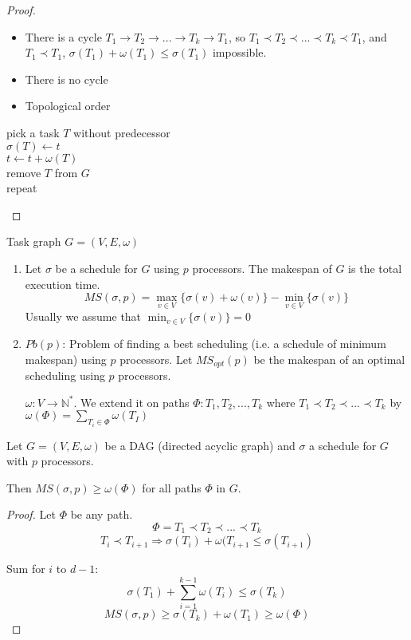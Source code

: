 \begin{proof}
\begin{itemize}
\item There is a cycle $T_1 \to T_2 \to ... \to T_k \to T_1$, so  $T_1 \prec T_2 \prec ... \prec T_k \prec T_1$, and $T_1\prec T_1$, $\sigma(T_1) + \omega(T_1) \leq \sigma(T_1)$ impossible.
\item There is no cycle
\item Topological order
\end{itemize}
\begin{algorithm}
pick a task $T$ without predecessor\\
$\sigma(T) \leftarrow t$\\
$t\leftarrow t + \omega(T)$\\
remove $T$ from $G$\\
repeat\\
\end{algorithm}
\end{proof}

\begin{defi}[Makespan]
Task graph $G=(V,E,\omega )$
\begin{enumerate}
\item Let $\sigma$ be a schedule for $G$ using $p$ processors. The makespan of $G$ is the total execution time.
\[MS(\sigma, p) = \max_{v\in V} \{\sigma (v) + \omega (v) \} - \min_{v\in V}\{\sigma ( v)\}\]
Usually we assume that $\min_{v\in V}\{\sigma ( v)\}=0$

\item $Pb(p)$: Problem of finding a best scheduling (i.e. a schedule of minimum makespan) using $p$ processors. Let $MS_{opt}(p)$ be the makespan of an optimal scheduling using $p$ processors.

$\omega : V \to \mathbb{N}^*$. We extend it on paths $\Phi : T_1,T_2,...,T_k$ where $T_1 \prec T_2 \prec ... \prec T_k$ by $\omega ( \Phi) =\sum_{T_i \in \Phi} \omega (T_I)$
\end{enumerate}
\end{defi}

\begin{prop}
Let $G=(V,E,\omega)$ be a DAG (directed acyclic graph) and $\sigma$ a schedule for $G$ with $p$ processors.

Then $MS(\sigma, p)\geq \omega (\Phi)$ for all paths $\Phi$ in $G$.
\end{prop}

\begin{proof}
Let $\Phi$ be any path. 
\[\Phi=T_1 \prec T_2 \prec ... \prec T_k\]
\[T_i \prec T_{i+1} \Rightarrow \sigma (T_i) + \omega ( T_{i+1} \leq \sigma (T_{i+1})\]

Sum for $i$ to $d-1$:
\[\sigma (T_1) + \sum_{i=1}^{k-1} \omega(T_i) \leq \sigma(T_k) \]
\[MS(\sigma, p) \geq \sigma (T_k) + \omega (T_1) \geq \omega (\Phi)\]
\end{proof}


